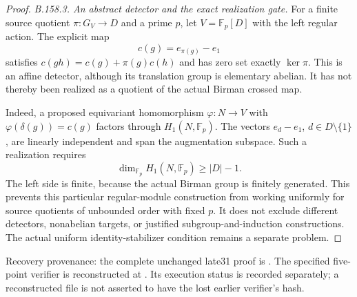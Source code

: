 \begin{proof}
\emph{B.158.3. An abstract detector and the exact realization gate.}
For a finite source quotient \(\pi:G_V\to D\) and a prime
\(p\), let \(V=\mathbb F_p[D]\) with the left regular action.
The explicit map
\[
 c(g)=e_{\pi(g)}-e_1
\]
satisfies \(c(gh)=c(g)+\pi(g)c(h)\) and has zero set exactly
\(\ker\pi\). This is an affine detector, although its
translation group is elementary abelian. It has not thereby
been realized as a quotient of the actual Birman crossed map.

Indeed, a proposed equivariant homomorphism \(\varphi:N\to V\)
with \(\varphi(\delta(g))=c(g)\) factors through
\(H_1(N,\mathbb F_p)\). The vectors \(e_d-e_1\),
\(d\in D\setminus\{1\}\), are linearly independent and span
the augmentation subspace. Such a realization requires
\[
 \dim_{\mathbb F_p}H_1(N,\mathbb F_p)\geq |D|-1.
\]
The left side is finite, because the actual Birman group is
finitely generated. This prevents this particular regular-module
construction from working uniformly for source quotients of
unbounded order with fixed \(p\). It does not exclude different
detectors, nonabelian targets, or justified subgroup-and-induction
constructions. The actual uniform identity-stabilizer condition
remains a separate problem.
\end{proof}

\noindent\footnotesize
Recovery provenance: the complete unchanged late31 proof is
.
The specified five-point verifier is reconstructed at
.
Its execution status is recorded separately; a reconstructed file
is not asserted to have the lost earlier verifier's hash.
\normalsize
